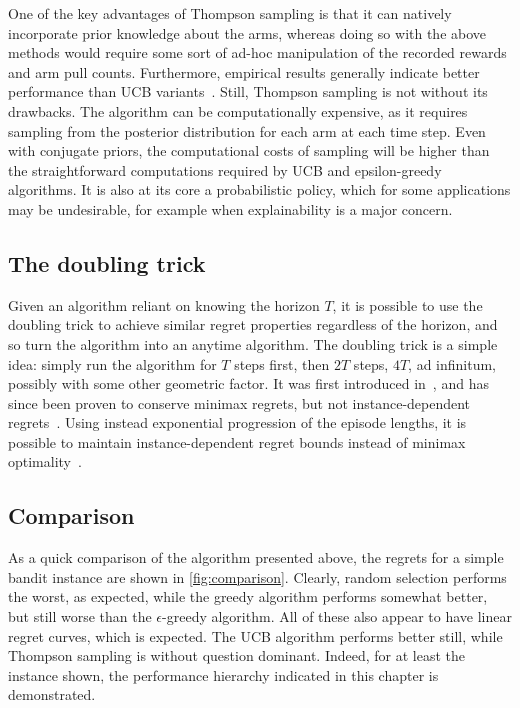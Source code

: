One of the key advantages of Thompson sampling is that it can natively incorporate prior knowledge about the arms, whereas doing so with the above methods would require some sort of ad-hoc manipulation of the recorded rewards and arm pull counts.
Furthermore, empirical results generally indicate better performance than UCB variants~\autocite{kaufmann2012}.
Still, Thompson sampling is not without its drawbacks.
The algorithm can be computationally expensive, as it requires sampling from the posterior distribution for each arm at each time step.
Even with conjugate priors, the computational costs of sampling will be higher than the straightforward computations required by UCB and epsilon-greedy algorithms.
It is also at its core a probabilistic policy, which for some applications may be undesirable, for example when explainability is a major concern.

\subsection{The doubling trick}
Given an algorithm reliant on knowing the horizon $T$, it is possible to use the doubling trick to achieve similar regret properties regardless of the horizon, and so turn the algorithm into an anytime algorithm.
The doubling trick is a simple idea: simply run the algorithm for $T$ steps first, then $2T$ steps, $4T$, ad infinitum, possibly with some other geometric factor.
It was first introduced in~\autocite{auer1995}, and has since been proven to conserve minimax regrets, but not instance-dependent regrets~\autocite{besson2018}.
Using instead exponential progression of the episode lengths, it is possible to maintain instance-dependent regret bounds instead of minimax optimality~\autocite{besson2018}.

\subsection{Comparison}
\label{sec:comparison}
As a quick comparison of the algorithm presented above, the regrets for a simple bandit instance are shown in \cref{fig:comparison}.
Clearly, random selection performs the worst, as expected, while the greedy algorithm performs somewhat better, but still worse than the $\epsilon$-greedy algorithm.
All of these also appear to have linear regret curves, which is expected.
The UCB algorithm performs better still, while Thompson sampling is without question dominant.
Indeed, for at least the instance shown, the performance hierarchy indicated in this chapter is demonstrated.

